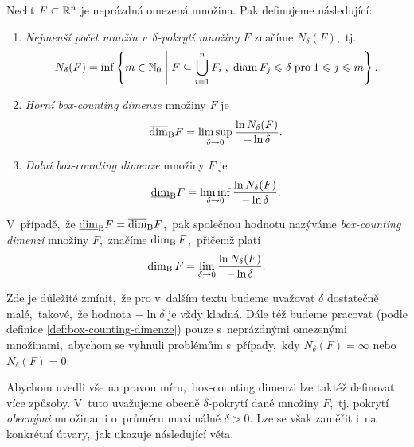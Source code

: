 \begin{definition}\label{def:box-counting-dimenze}
    Nechť $F\subset \mathbb{R}^n$ je neprázdná omezená množina. Pak definujeme následující:
    \begin{enumerate}[label=(\alph*)]
        \item \emph{Nejmenší počet množin v~$\delta$-pokrytí množiny $F$} značíme $N_\delta(F)$,~tj.
        \[N_\delta(F)=\inf\left\{m\in\mathbb{N}_0\;\middle|\;F\subseteq\bigcup_{i=1}^n F_i\;,\;\operatorname{diam}{F_j}\leqslant\delta\;\text{pro}\;1\leqslant j\leqslant m\right\}.\]
        \item \emph{Horní box-counting dimenze} množiny $F$ je
        \[\overline{\dim}_\textup{B}{F}=\limsup_{\delta\to 0}\dfrac{\ln{N_\delta(F)}}{-\ln{\delta}}.\]
        \item \emph{Dolní box-counting dimenze} množiny $F$ je
        \[\underline{\dim}_\textup{B}{F}=\liminf_{\delta\to 0}\dfrac{\ln{N_\delta(F)}}{-\ln{\delta}}.\]
    \end{enumerate}
    V~případě,~že $\underline{\dim}_\textup{B}{F}=\overline{\dim}_\textup{B}{F}$,~pak společnou hodnotu nazýváme \emph{box-counting dimenzí} množiny $F$,~značíme $\operatorname{dim_B}{F}$,~přičemž platí
    \[\operatorname{dim_B}{F}=\lim_{\delta\to 0}\dfrac{\ln{N_\delta(F)}}{-\ln{\delta}}.\]
\end{definition}
\begin{remark}
    Zde je důležité zmínit,~že pro v~dalším textu budeme uvažovat $\delta$ dostatečně malé,~takové,~že hodnota $-\ln{\delta}$ je vždy kladná. Dále též budeme pracovat (podle definice \ref{def:box-counting-dimenze}) pouze s~neprázdnými omezenými množinami,~abychom se vyhnuli problémům s~případy,~kdy $N_\delta(F)=\infty$ nebo $N_\delta(F)=0$.
\end{remark}
Abychom uvedli vše na pravou míru,~box-counting dimenzi lze taktéž definovat více způsoby. V~tuto uvažujeme obecně $\delta$-pokrytí dané množiny $F$,~tj. pokrytí \emph{obecnými} množinami o~průměru maximálně $\delta>0$. Lze se však zaměřit i~na konkrétní útvary,~jak ukazuje následující věta.
